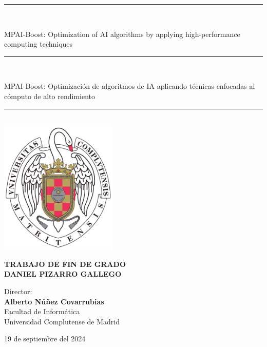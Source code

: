 \begin{titlepage}
	\thispagestyle{empty}
	
	\begin{center}
		
		\vspace{1cm}
		
		\vspace{0.65cm}
		\rule{2in}{0.5pt}\\
		\vspace{0.85cm}
		
		{\Large MPAI-Boost: Optimization of AI algorithms by applying high-performance computing techniques}\\
		
		\vspace{0.65cm}
		\rule{2in}{0.5pt}\\
		\vspace{0.85cm}
		
		{\Large MPAI-Boost: Optimización de algoritmos de IA aplicando técnicas enfocadas al cómputo de alto rendimiento}\\
		
		\vspace{0.65cm}
		\rule{2in}{0.5pt}\\
		
		
		
		\vfill
		\includegraphics[height=2.5in]{images/escudo_ucm.pdf}
		\vfill
		
		
		
		\textbf{TRABAJO DE FIN DE GRADO}\\
		\vspace{0.7cm}
		\textbf{DANIEL PIZARRO GALLEGO}
		
		\vspace{1cm}
		
		Director:\\
		\textbf{Alberto Núñez Covarrubias}\\
		
		\vspace{1.8cm}
		Facultad de Informática\\
		Universidad Complutense de Madrid
		\vspace{0.5cm}
		
		19 de septiembre del 2024
		
		\vspace{0.2cm}
		
	\end{center}
\end{titlepage}